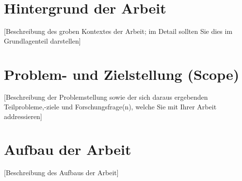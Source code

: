 \section{Hintergrund der Arbeit}
[Beschreibung des groben Kontextes der Arbeit; im Detail sollten Sie dies im Grundlagenteil darstellen] 


\section{Problem- und Zielstellung (Scope)}
[Beschreibung der Problemstellung sowie der sich daraus ergebenden Teilprobleme,-ziele und Forschungsfrage(n), welche Sie mit Ihrer Arbeit addressieren]


\section{Aufbau der Arbeit}
[Beschreibung des Aufbaus der Arbeit]


